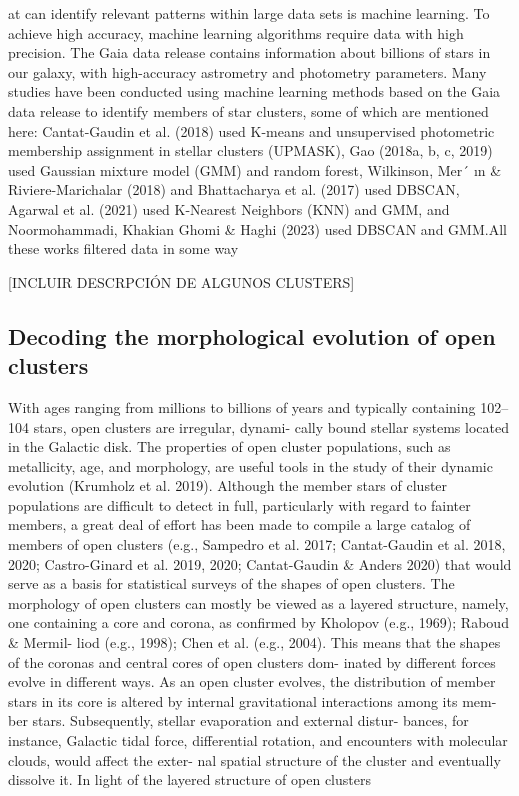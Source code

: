 \documentclass[../Main.tex]{subfiles}
\begin{document}
{at can identify relevant patterns within large data sets is machine
learning. To achieve high accuracy, machine learning algorithms
require data with high precision. The Gaia data release contains
information about billions of stars in our galaxy, with high-accuracy
astrometry and photometry parameters. Many studies have been
conducted using machine learning methods based on the Gaia data
release to identify members of star clusters, some of which are
mentioned here: Cantat-Gaudin et al. (2018) used K-means and
unsupervised photometric membership assignment in stellar clusters
(UPMASK), Gao (2018a, b, c, 2019) used Gaussian mixture model
(GMM) and random forest, Wilkinson, Mer´
ın & Riviere-Marichalar
(2018) and Bhattacharya et al. (2017) used DBSCAN, Agarwal
et al. (2021) used K-Nearest Neighbors (KNN) and GMM, and
Noormohammadi, Khakian Ghomi & Haghi (2023) used DBSCAN
and GMM.All these works filtered data in some way

[INCLUIR DESCRPCIÓN DE ALGUNOS CLUSTERS]
\subsection{Decoding the morphological evolution of open clusters}

With ages ranging from millions to billions of years and typically
containing 102–104 stars, open clusters are irregular, dynami-
cally bound stellar systems located in the Galactic disk. The
properties of open cluster populations, such as metallicity, age,
and morphology, are useful tools in the study of their dynamic
evolution (Krumholz et al. 2019). Although the member stars
of cluster populations are diﬃcult to detect in full, particularly
with regard to fainter members, a great deal of eﬀort has been
made to compile a large catalog of members of open clusters
(e.g., Sampedro et al. 2017; Cantat-Gaudin et al. 2018, 2020;
Castro-Ginard et al. 2019, 2020; Cantat-Gaudin & Anders 2020)
that would serve as a basis for statistical surveys of the shapes of
open clusters.
The morphology of open clusters can mostly be viewed as
a layered structure, namely, one containing a core and corona,
as confirmed by Kholopov (e.g., 1969); Raboud & Mermil-
liod (e.g., 1998); Chen et al. (e.g., 2004). This means that the
shapes of the coronas and central cores of open clusters dom-
inated by diﬀerent forces evolve in diﬀerent ways. As an open
cluster evolves, the distribution of member stars in its core is
altered by internal gravitational interactions among its mem-
ber stars. Subsequently, stellar evaporation and external distur-
bances, for instance, Galactic tidal force, diﬀerential rotation,
and encounters with molecular clouds, would aﬀect the exter-
nal spatial structure of the cluster and eventually dissolve it. In
light of the layered structure of open clusters

}
\end{document}
